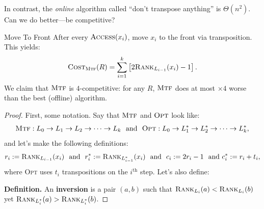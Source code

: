 In contrast, the \emph{online} algorithm called ``don't transpose anything'' is $\Theta(n^2)$.  Can we do better---be competitive?

\begin{solution}{Move To Front}
    After every $\textsc{Access}(x_i)$, move $x_i$ to the front via transposition.  This yields:
    \[ \textsc{Cost}_{\textsc{Mtf}}(R) = \sum_{i = 1}^k \left [ 2 \textsc{Rank}_{L_{i - 1}}(x_i) - 1 \right ]. \]
    We claim that $\textsc{Mtf}$ is $4$-competitive: for any $R$, $\textsc{Mtf}$ does at most $\times 4$ worse than the best (offline) algorithm.
\end{solution}

\begin{proof}
    First, some notation.  Say that $\textsc{Mtf}$ and $\textsc{Opt}$ look like:
    \[ \textsc{Mtf}: L_0 \to L_1 \to L_2 \to \dots \to L_k ~ \text{ and } ~ \textsc{Opt}: L_0 \to L_1^* \to L_2^* \to \dots \to L_k^*, \]
    and let's make the following definitions:
    \[ r_i := \textsc{Rank}_{L_{i - 1}}(x_i) ~ \text{ and } ~ r_i^* := \textsc{Rank}_{L_{i - 1}^*}(x_i) ~ \text{ and } ~ c_i := 2r_i - 1 ~ \text{ and } c_i^* := r_i + t_i, \]
    where \textsc{Opt} uses $t_i$ transpositions on the $i^{\text{th}}$ step.  Let's also define:

    \textbf{Definition.} An \textbf{inversion} is a pair $(a, b)$ such that $\textsc{Rank}_{L_i}(a) < \textsc{Rank}_{L_i}(b)$ yet $\textsc{Rank}_{L_i^*}(a) > \textsc{Rank}_{L_i^*}(b)$.


\end{proof}
